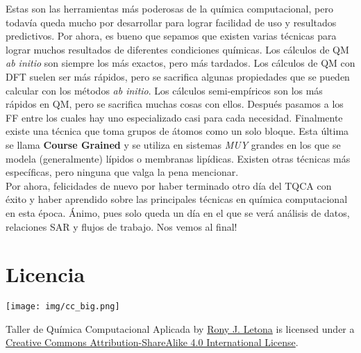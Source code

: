 \documentclass[10pt,letterpaper]{article}
\begin{document}
Estas son las herramientas m\'as poderosas de la qu\'imica computacional, pero todav\'ia queda mucho por desarrollar para lograr facilidad de uso y resultados predictivos. Por ahora, es bueno que sepamos que existen varias t\'ecnicas para lograr muchos resultados de diferentes condiciones qu\'imicas. Los c\'alculos de QM \textit{ab initio} son siempre los m\'as exactos, pero m\'as tardados. Los c\'alculos de QM con DFT suelen ser m\'as r\'apidos, pero se sacrifica algunas propiedades que se pueden calcular con los m\'etodos \textit{ab initio}. Los c\'alculos semi-emp\'iricos son los m\'as r\'apidos en QM, pero se sacrifica muchas cosas con ellos. Despu\'es pasamos a los FF entre los cuales hay uno especializado casi para cada necesidad. Finalmente existe una t\'ecnica que toma grupos de \'atomos como un solo bloque. Esta \'ultima se llama \textbf{Course Grained} y se utiliza en sistemas \emph{MUY} grandes en los que se modela (generalmente) l\'ipidos o membranas lip\'idicas. Existen otras t\'ecnicas m\'as espec\'ificas, pero ninguna que valga la pena mencionar.\\

Por ahora, felicidades de nuevo por haber terminado otro d\'ia del TQCA con \'exito y haber aprendido sobre las principales t\'ecnicas en qu\'imica computacional en esta \'epoca. \'Animo, pues solo queda un d\'ia en el que se ver\'a an\'alisis de datos, relaciones SAR y flujos de trabajo. Nos vemos al final!

\section*{Licencia}

\noindent \texttt{[image: img/cc\_big.png]}

\noindent Taller de Qu\'imica Computacional Aplicada by \href{http://github.com/zronyj/TQCA}{Rony J. Letona} is licensed under a \href{http://creativecommons.org/licenses/by-sa/4.0/}{Creative Commons Attribution-ShareAlike 4.0 International License}.
\end{document}
